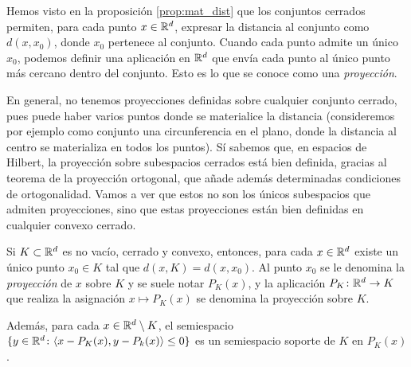 \documentclass{book}
\begin{document}
Hemos visto en la proposición \ref{prop:mat_dist} que los conjuntos cerrados permiten, para cada punto $x \in \mathbb{R}^d$, expresar la distancia al conjunto como $d(x,x_0)$, donde $x_0$ pertenece al conjunto. Cuando cada punto admite un único $x_0$, podemos definir una aplicación en $\mathbb{R}^d$ que envía cada punto al único punto más cercano dentro del conjunto. Esto es lo que se conoce como una \emph{proyección}.

En general, no tenemos proyecciones definidas sobre cualquier conjunto cerrado, pues puede haber varios puntos donde se materialice la distancia (consideremos por ejemplo como conjunto una circunferencia en el plano, donde la distancia al centro se materializa en todos los puntos). Sí sabemos que, en espacios de Hilbert, la proyección sobre subespacios cerrados está bien definida, gracias al teorema de la proyección ortogonal, que añade además determinadas condiciones de ortogonalidad. Vamos a ver que estos no son los únicos subespacios que admiten proyecciones, sino que estas proyecciones están bien definidas en cualquier convexo cerrado.

\begin{thm} \label{thm:convex_projection}
	Si $K \subset \mathbb{R}^d$ es no vacío, cerrado y convexo, entonces, para cada $x \in \mathbb{R}^d$ existe un único punto $x_0 \in K$ tal que $d(x,K) = d(x,x_0)$. Al punto $x_0$ se le denomina la \emph{proyección} de $x$ sobre $K$ y se suele notar $P_K(x)$, y la aplicación $P_K \colon \mathbb{R}^d \to K$ que realiza la asignación $x \mapsto P_K(x)$ se denomina la proyección sobre $K$.

	Además, para cada $x \in \mathbb{R}^d \setminus K$, el semiespacio $\{y \in \mathbb{R}^d \colon \langle x - P_K(x), y - P_k(x) \rangle \le 0 \}$ es un semiespacio soporte de $K$ en $P_K(x)$.
\end{thm}
\end{document}
